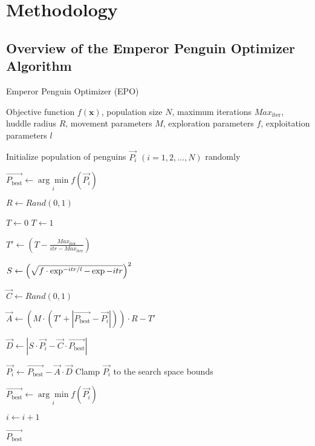 \section{Methodology}

\subsection{Overview of the Emperor Penguin Optimizer Algorithm}

\begin{algorithm}[H]
    \caption{Emperor Penguin Optimizer (EPO)}
    \label{alg:epo}
    \begin{algorithmic}[1]
    \Require Objective function $f(\mathbf{x})$, population size $N$, maximum iterations $Max_{\text{iter}}$, huddle radius $R$, movement parameters $M$, exploration parameters $f$, exploitation parameters $l$
    
    \State Initialize population of penguins $\vec{P_i}$ $(i = 1, 2, \dots, N)$ randomly

    \State $\vec{P_{\text{best}}} \gets \underset{i}{\arg\min} f(\vec{P_i})$ 
    
        \State $R \gets Rand(0, 1)$ 
        
            \State $T \gets 0$
        \Else
            \State $T \gets 1$
        \EndIf

        \State $T' \gets (T - \frac{Max_{\text{iter}}}{itr - Max_{\text{iter}}})$ 

        \State $S \gets \Bigl(\sqrt{f\cdot\exp^{-itr/l}-\exp{-itr}}\Bigr)^2$ 

            \State $\vec{C} \gets Rand(0, 1)$ 
            
            \State $\vec{A} \gets (M \cdot (T' + |\vec{P_{\text{best}}} - \vec{P_i}|)) \cdot R - T'$ 

            \State $\vec{D} \gets |S \cdot \vec{P_i} - \vec{C} \cdot \vec{P_{\text{best}}}|$ 

            \State $\vec{P_i} \gets \vec{P_{\text{best}}} - \vec{A} \cdot \vec{D}$ 
            \State Clamp $\vec{P_i}$ to the search space bounds
        \EndFor

         

            \State $\vec{P_{\text{best}}} \gets \underset{i}{\arg\min} f(\vec{P_i})$ 
        \EndIf

        \State $i \gets i + 1$
    \EndWhile
  
    \State \Return $\vec{P_{\text{best}}}$

    \end{algorithmic}
\end{algorithm}

